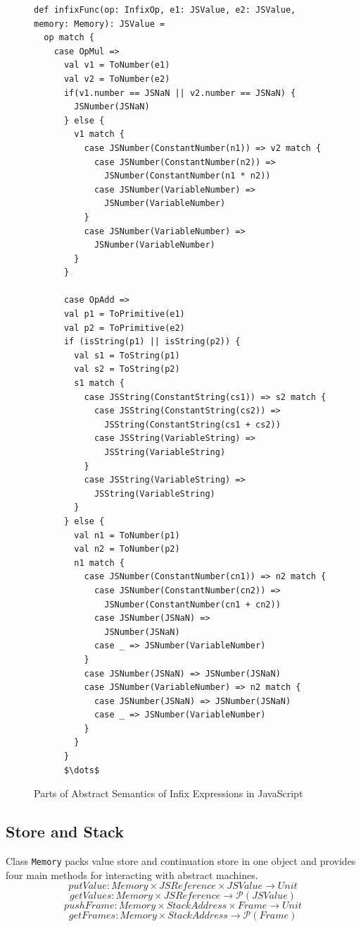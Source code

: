 \documentclass{article}
\begin{document}
\begin{figure}
  \lstset{language=Scala, mathescape}
  \begin{lstlisting}
def infixFunc(op: InfixOp, e1: JSValue, e2: JSValue, memory: Memory): JSValue =
  op match {
    case OpMul =>
      val v1 = ToNumber(e1)
      val v2 = ToNumber(e2)
      if(v1.number == JSNaN || v2.number == JSNaN) {
        JSNumber(JSNaN)
      } else {
        v1 match {
          case JSNumber(ConstantNumber(n1)) => v2 match {
            case JSNumber(ConstantNumber(n2)) =>
              JSNumber(ConstantNumber(n1 * n2))
            case JSNumber(VariableNumber) =>
              JSNumber(VariableNumber)
          }
          case JSNumber(VariableNumber) =>
            JSNumber(VariableNumber)
        }
      }

      case OpAdd =>
      val p1 = ToPrimitive(e1)
      val p2 = ToPrimitive(e2)
      if (isString(p1) || isString(p2)) {
        val s1 = ToString(p1)
        val s2 = ToString(p2)
        s1 match {
          case JSString(ConstantString(cs1)) => s2 match {
            case JSString(ConstantString(cs2)) =>
              JSString(ConstantString(cs1 + cs2))
            case JSString(VariableString) =>
              JSString(VariableString)
          }
          case JSString(VariableString) =>
            JSString(VariableString)
        }
      } else {
        val n1 = ToNumber(p1)
        val n2 = ToNumber(p2)
        n1 match {
          case JSNumber(ConstantNumber(cn1)) => n2 match {
            case JSNumber(ConstantNumber(cn2)) =>
              JSNumber(ConstantNumber(cn1 + cn2))
            case JSNumber(JSNaN) =>
              JSNumber(JSNaN)
            case _ => JSNumber(VariableNumber)
          }
          case JSNumber(JSNaN) => JSNumber(JSNaN)
          case JSNumber(VariableNumber) => n2 match {
            case JSNumber(JSNaN) => JSNumber(JSNaN)
            case _ => JSNumber(VariableNumber)
          }
        }
      }
      $\dots$
  \end{lstlisting}
  \caption{Parts of Abstract Semantics of Infix Expressions in JavaScript}
\label{fig:infix}
\end{figure}
\fi
\subsection{Store and Stack}
\label{sub:Store and Stack}

Class \verb|Memory| packs value store and continuation store in one object and provides four main methods for interacting with abstract machines.
\[
putValue: Memory \times JSReference \times JSValue \to Unit
\]
\[
getValues: Memory \times JSReference \to \mathcal{P}(JSValue)
\]
\[
pushFrame: Memory \times StackAddress \times Frame \to Unit
\]
\[
getFrames: Memory \times StackAddress \to \mathcal{P}(Frame)
\]
\end{document}
